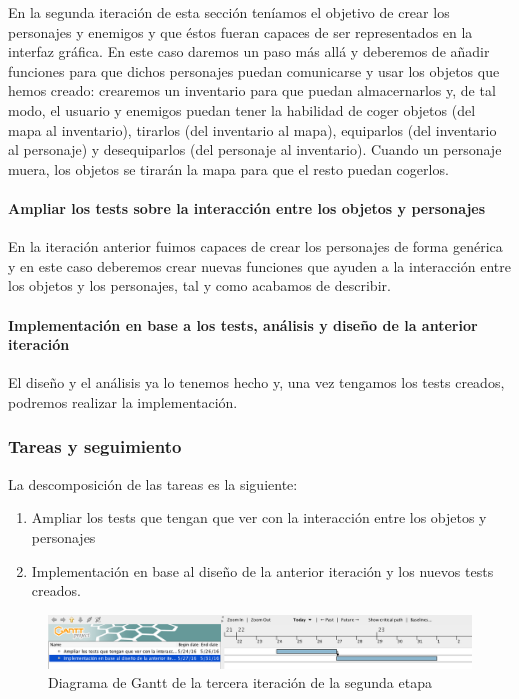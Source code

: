 En la segunda iteración de esta sección teníamos el objetivo de crear los personajes y enemigos y que éstos fueran capaces de ser representados en la interfaz gráfica. En este caso daremos un paso más allá y deberemos de añadir funciones para que dichos personajes puedan comunicarse y usar los objetos que hemos creado: crearemos un inventario para que puedan almacernarlos y, de tal modo, el usuario y enemigos puedan tener la habilidad de coger objetos (del mapa al inventario), tirarlos (del inventario al mapa), equiparlos (del inventario al personaje) y desequiparlos (del personaje al inventario). Cuando un personaje muera, los objetos se tirarán la mapa para que el resto puedan cogerlos.

\paragraph{Ampliar los tests sobre la interacción entre los objetos y personajes} En la iteración anterior fuimos capaces de crear los personajes de forma genérica y en este caso deberemos crear nuevas funciones que ayuden a la interacción entre los objetos y los personajes, tal y como acabamos de describir.

\paragraph{Implementación en base a los tests, análisis y diseño de la anterior iteración} El diseño y el análisis ya lo tenemos hecho y, una vez tengamos los tests creados, podremos realizar la implementación.

\subsubsection{Tareas y seguimiento}

La descomposición de las tareas es la siguiente:

\begin{enumerate}[label=\bfseries WBS 3.\arabic*]
  \item Ampliar los tests que tengan que ver con la interacción entre los objetos y personajes
  \item Implementación en base al diseño de la anterior iteración y los nuevos tests creados.
\end{enumerate}

\begin{figure}
    \includegraphics[width=\textwidth,height=\textheight,keepaspectratio]{./img/sec2it3.png}
  \caption{Diagrama de Gantt de la tercera iteración de la segunda etapa}
  \label{fig:sec2it3}
\end{figure}


